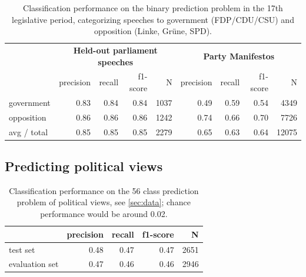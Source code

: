 \documentclass[runningheads,a4paper]{llncs}
\begin{document}
\begin{table}[t]
\begin{center}
\begin{tabular}{lrrrrrrrr}
& \multicolumn{4}{c}{\bf Held-out parliament speeches} & \multicolumn{4}{c}{\bf Party Manifestos}\\
    &         precision    &recall &  f1-score  & N    &         precision    &recall &  f1-score  & N\\
\hline \hline
government    &   0.83   &   0.84&      0.84     & 1037 & 0.49  &    0.59 &     0.54  &    4349\\
 opposition     &  0.86  &    0.86   &   0.86    &  1242 & 0.74 &     0.66  &    0.70   &   7726\\
\hline
avg / total   &    0.85 &     0.85 &     0.85  &    2279 & 0.65  &     0.63  &     0.64  &    12075\\

%
\end{tabular}
\end{center}
\caption{
\label{tab:results_binary}
Classification performance on the binary prediction problem in the 17th legislative period, categorizing speeches to government (FDP/CDU/CSU) and opposition (Linke, Gr\"une, SPD).
}
\end{table}

\subsection{Predicting political views}

\begin{table}[t]
\begin{center}
\begin{tabular}{lrrrr}
    &         precision    &recall &  f1-score  & N\\
\hline\hline
test set    &  0.48   &   0.47  &    0.47  &    2651\\
evaluation set    &  0.47    &  0.46 &     0.46 &     2946\\
%
\end{tabular}
\end{center}
\caption{
\label{tab:results_avg_political_view}
Classification performance on the 56 class prediction problem of political views, see \autoref{sec:data}; chance performance would be around 0.02.
}
\end{table}
\end{document}
